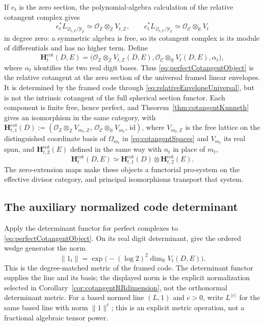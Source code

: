 \documentclass[11pt]{amsart}
\theoremstyle{definition}
\theoremstyle{remark}
\newcommand{\R}{\mathbb R}
\newcommand{\Z}{\mathbb Z}
\begin{document}
If $e_t$ is the zero section, the polynomial-algebra calculation of the
relative cotangent complex gives
\[
 e_t^*L_{\mathcal Q_{t,\Z}/\mathscr Y_{\Z}}
   \simeq\mathcal O_{\Z}\otimes_{\Z}V_{t,\Z},\qquad
 e_t^*L_{\mathcal Q_{t,\mathcal C}/\mathscr Y_{\mathcal C}}
   \simeq\mathcal O_{\mathcal C}\otimes_{\R}V_t
\]
in degree zero: a symmetric algebra is free, so its cotangent complex is its
module of differentials and has no higher term.  Define
\begin{equation}\label{eq:perfectCotangentObject}
 \mathbf H_t^{\mathrm{cot}}(D,E)=
 \bigl(
 \mathcal O_{\Z}\otimes_{\Z}V_{t,\Z}(D,E),
 \mathcal O_{\mathcal C}\otimes_{\R}V_t(D,E),
 \alpha_t
 \bigr),
\end{equation}
where $\alpha_t$ identifies the two real digit bases.  Thus
\eqref{eq:perfectCotangentObject} is the relative cotangent at the zero
section of the universal framed linear envelopes.  It is determined by the
framed code through \eqref{eq:relativeEnvelopeUniversal}, but is not the
intrinsic cotangent of the full spherical section functor.  Each component
is finite free, hence perfect, and
Theorem~\ref{thm:cotangentKunneth} gives an isomorphism in the same category,
with $\mathbf H_{t,1}^{\mathrm{cot}}(D):=(\mathcal O_{\Z}\otimes_{\Z}
V_{m_t,\Z},\,\mathcal O_{\mathcal C}\otimes_{\R}V_{m_t},\,\mathrm{id})$,
where $V_{m_t,\Z}$ is the free lattice on the distinguished coordinate basis
of $\Omega_{m_t}$ in \eqref{eq:cotangentSpaces} and $V_{m_t}$ its real span,
and $\mathbf H_{t,2}^{\mathrm{cot}}(E)$ defined in the same way with $n_t$
in place of $m_t$,
\begin{equation}\label{eq:perfectKunneth}
 \mathbf H_t^{\mathrm{cot}}(D,E)
 \simeq\mathbf H_{t,1}^{\mathrm{cot}}(D)
 \otimes\mathbf H_{t,2}^{\mathrm{cot}}(E).
\end{equation}
The zero-extension maps make these objects a functorial pro-system on the
effective divisor category, and principal isomorphisms transport that
system.

\subsection{The auxiliary normalized code determinant}

Apply the determinant functor for perfect complexes
\cite{KnudsenMumford} to
\eqref{eq:perfectCotangentObject}.  On its real digit determinant, give the
ordered wedge generator the norm
\begin{equation}\label{eq:finiteRRmetric}
 \|1_t\|=\exp\bigl(- (\log2)^2\dim_{\R}V_t(D,E)\bigr).
\end{equation}
This is the degree-matched metric of the framed code.  The determinant
functor supplies the line and its basis; the displayed norm is the explicit
normalization selected in Corollary~\ref{cor:cotangentRRdimension}, not the
orthonormal determinant metric.
For a based normed line $(L,1)$ and $c>0$, write $L^{\langle c\rangle}$ for
the same based line with norm $\|1\|^c$; this is an explicit metric
operation, not a fractional algebraic tensor power.
\end{document}
